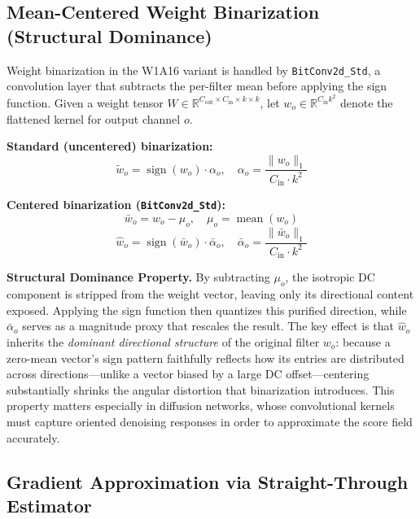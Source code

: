 \documentclass[twocolumn, journal]{IEEEtran}
\begin{document}
\subsection{Mean-Centered Weight Binarization (Structural Dominance)}

Weight binarization in the W1A16 variant is handled by \texttt{BitConv2d\_Std}, a
convolution layer that subtracts the per-filter mean before applying the sign function.
Given a weight tensor $W \in \mathbb{R}^{C_\text{out} \times C_\text{in} \times k
\times k}$, let $w_o \in \mathbb{R}^{C_\text{in}k^2}$ denote the flattened kernel for
output channel $o$.

\textbf{Standard (uncentered) binarization:}
\begin{equation}
  \tilde{w}_o = \operatorname{sign}(w_o)\cdot\alpha_o,
  \quad
  \alpha_o = \frac{\|w_o\|_1}{C_\text{in}\cdot k^2}
  \label{eq:std-bin}
\end{equation}

\textbf{Centered binarization (\texttt{BitConv2d\_Std}):}
\begin{equation}
  \bar{w}_o = w_o - \mu_o,
  \quad
  \mu_o = \operatorname{mean}(w_o)
  \label{eq:center}
\end{equation}
\begin{equation}
  \hat{w}_o = \operatorname{sign}(\bar{w}_o)\cdot\bar\alpha_o,
  \quad
  \bar\alpha_o = \frac{\|\bar{w}_o\|_1}{C_\text{in}\cdot k^2}
  \label{eq:cen-bin}
\end{equation}

\textbf{Structural Dominance Property.} By subtracting $\mu_o$, the isotropic DC
component is stripped from the weight vector, leaving only its directional content
exposed. Applying the sign function then quantizes this purified direction, while
$\bar\alpha_o$ serves as a magnitude proxy that rescales the result. The key effect is
that $\hat{w}_o$ inherits the \emph{dominant directional structure} of the original
filter $w_o$: because a zero-mean vector's sign pattern faithfully reflects how its
entries are distributed across directions---unlike a vector biased by a large DC
offset---centering substantially shrinks the angular distortion that binarization
introduces. This property matters especially in diffusion networks, whose convolutional
kernels must capture oriented denoising responses in order to approximate the score
field accurately.

\subsection{Gradient Approximation via Straight-Through Estimator}
\end{document}
